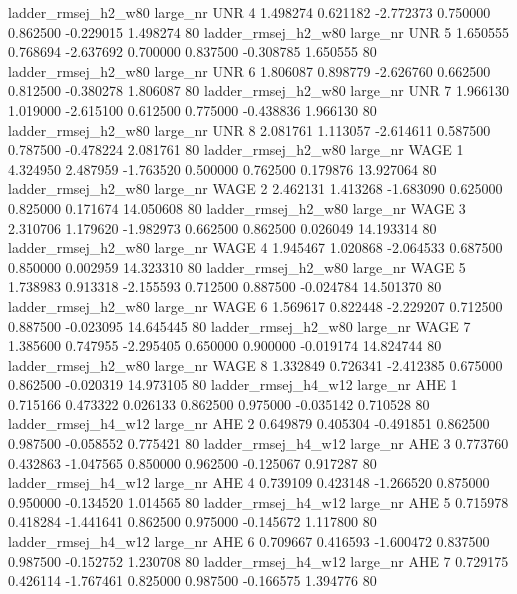 ladder_rmsej_h2_w80   large_nr      UNR                 4  1.498274  0.621182  -2.772373 0.750000 0.862500 -0.229015    1.498274 80
ladder_rmsej_h2_w80   large_nr      UNR                 5  1.650555  0.768694  -2.637692 0.700000 0.837500 -0.308785    1.650555 80
ladder_rmsej_h2_w80   large_nr      UNR                 6  1.806087  0.898779  -2.626760 0.662500 0.812500 -0.380278    1.806087 80
ladder_rmsej_h2_w80   large_nr      UNR                 7  1.966130  1.019000  -2.615100 0.612500 0.775000 -0.438836    1.966130 80
ladder_rmsej_h2_w80   large_nr      UNR                 8  2.081761  1.113057  -2.614611 0.587500 0.787500 -0.478224    2.081761 80
ladder_rmsej_h2_w80   large_nr     WAGE                 1  4.324950  2.487959  -1.763520 0.500000 0.762500  0.179876   13.927064 80
ladder_rmsej_h2_w80   large_nr     WAGE                 2  2.462131  1.413268  -1.683090 0.625000 0.825000  0.171674   14.050608 80
ladder_rmsej_h2_w80   large_nr     WAGE                 3  2.310706  1.179620  -1.982973 0.662500 0.862500  0.026049   14.193314 80
ladder_rmsej_h2_w80   large_nr     WAGE                 4  1.945467  1.020868  -2.064533 0.687500 0.850000  0.002959   14.323310 80
ladder_rmsej_h2_w80   large_nr     WAGE                 5  1.738983  0.913318  -2.155593 0.712500 0.887500 -0.024784   14.501370 80
ladder_rmsej_h2_w80   large_nr     WAGE                 6  1.569617  0.822448  -2.229207 0.712500 0.887500 -0.023095   14.645445 80
ladder_rmsej_h2_w80   large_nr     WAGE                 7  1.385600  0.747955  -2.295405 0.650000 0.900000 -0.019174   14.824744 80
ladder_rmsej_h2_w80   large_nr     WAGE                 8  1.332849  0.726341  -2.412385 0.675000 0.862500 -0.020319   14.973105 80
ladder_rmsej_h4_w12   large_nr      AHE                 1  0.715166  0.473322   0.026133 0.862500 0.975000 -0.035142    0.710528 80
ladder_rmsej_h4_w12   large_nr      AHE                 2  0.649879  0.405304  -0.491851 0.862500 0.987500 -0.058552    0.775421 80
ladder_rmsej_h4_w12   large_nr      AHE                 3  0.773760  0.432863  -1.047565 0.850000 0.962500 -0.125067    0.917287 80
ladder_rmsej_h4_w12   large_nr      AHE                 4  0.739109  0.423148  -1.266520 0.875000 0.950000 -0.134520    1.014565 80
ladder_rmsej_h4_w12   large_nr      AHE                 5  0.715978  0.418284  -1.441641 0.862500 0.975000 -0.145672    1.117800 80
ladder_rmsej_h4_w12   large_nr      AHE                 6  0.709667  0.416593  -1.600472 0.837500 0.987500 -0.152752    1.230708 80
ladder_rmsej_h4_w12   large_nr      AHE                 7  0.729175  0.426114  -1.767461 0.825000 0.987500 -0.166575    1.394776 80
